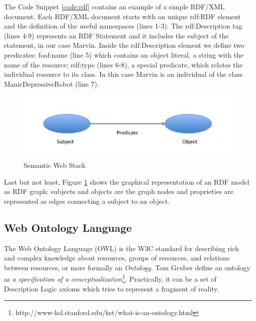 The Code Snippet \ref{code:rdf} contains an example of a simple RDF/XML document. Each RDF/XML document starts with an unique rdf:RDF element and the definition of the useful namespaces (lines 1-3). The rdf:Description tag (lines 4-9) represents an RDF Statement and it includes the subject of the statement, in our case Marvin. Inside the rdf:Description element we define two predicates: foaf:name (line 5) which contains an object literal, a string with the name of the resource; rdf:type (lines 6-8), a special predicate, which relates the individual resource to its class. In this case Marvin is an individual of the class ManicDepressiveRobot (line 7).

\begin{figure}[tbh]
  \centering
	\includegraphics[width=0.75\linewidth]{images/rdf-graph}
	\caption{Semantic Web Stack} 
  	\label{fig:rdf-graph}
\end{figure}

Last but not least, Figure \ref{fig:rdf-graph} shows the graphical representation of an RDF model as RDF graph:  subjects and objects are the graph nodes and proprieties are represented as edges connecting a subject to an object. 




\subsection{Web Ontology Language}\label{sec:owl}

The Web Ontology Language (OWL) is the W3C standard for describing rich and complex knowledge about resources, groups of resources, and relations between resources, or more formally an \textit{Ontology}. Tom Gruber define an ontology as \textit{a specification of a conceptualization}\footnote{http://www-ksl.stanford.edu/kst/what-is-an-ontology.html}. Practically, it can be a set of Description Logic axioms which tries to represent a fragment of reality. 

